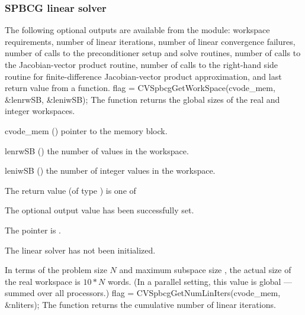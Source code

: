 \subsubsection{SPBCG linear solver}\label{sss:optout_spbcg}
The following optional outputs are available from the {\cvspbcg}
module: workspace requirements, number of linear iterations, number of
linear convergence failures, number of calls to the preconditioner
setup and solve routines, number of calls to the Jacobian-vector
product routine, number of calls to the right-hand side routine for
finite-difference Jacobian-vector product approximation, and last
return value from a {\cvspbcg} function.
{
  flag = CVSpbcgGetWorkSpace(cvode\_mem, \&lenrwSB, \&leniwSB);
}
{
  The function  returns the global sizes of the
  {\cvspbcg} real and integer workspaces.
}
{
  \begin{args}
  \item[cvode\_mem] ()
    pointer to the {\cvode} memory block.
  \item[lenrwSB] ()
    the number of  values in the {\cvspbcg} workspace.
  \item[leniwSB] ()
    the number of integer values in the {\cvspbcg} workspace.
  \end{args}
}
{
  The return value  (of type ) is one of
  \begin{args}
  \item[\Id{CVSPBCG\_SUCCESS}] 
    The optional output value has been successfully set.
  \item[\Id{CVSPBCG\_MEM\_NULL}]
    The  pointer is .
  \item[\Id{CVSPBCG\_LMEM\_NULL}]
    The {\cvspbcg} linear solver has not been initialized.
  \end{args}
}
{
  In terms of the problem size $N$ and maximum subspace size , 
  the actual size of the real workspace is $10*N$  words.
  (In a parallel setting, this value is global --- summed over all processors.)
}
{
  flag = CVSpbcgGetNumLinIters(cvode\_mem, \&nliters);
}
{
  The function  returns the
  cumulative number of linear iterations.
}
